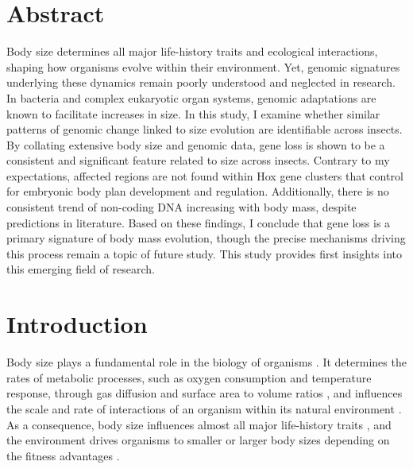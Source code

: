 \documentclass[11pt]{article}
\begin{document}
\section*{Abstract}
Body size determines all major life-history traits and ecological interactions, shaping how organisms evolve within their environment. Yet, genomic signatures underlying these dynamics remain poorly understood and neglected in research. In bacteria and complex eukaryotic organ systems, genomic adaptations are known to facilitate increases in size. In this study, I examine whether similar patterns of genomic change linked to size evolution are identifiable across insects. By collating extensive body size and genomic data, gene loss is shown to be a consistent and significant feature related to size across insects. Contrary to my expectations, affected regions are not found within Hox gene clusters that control for embryonic body plan development and regulation. Additionally, there is no consistent trend of non-coding DNA increasing with body mass, despite predictions in literature. Based on these findings, I conclude that gene loss is a primary signature of body mass evolution, though the precise mechanisms driving this process remain a topic of future study. This study provides first insights into this emerging field of research.
\pagebreak

\tableofcontents
\thispagestyle{empty}
\pagebreak
\setcounter{page}{1}


\linenumbers


\section{Introduction}
Body size plays a fundamental role in the biology of organisms \citep{roff1994evolution}. It determines the rates of metabolic processes, such as oxygen consumption and temperature response, through gas diffusion and surface area to volume ratios \citep{gasdiffusion}, and influences the scale and rate of interactions of an organism within its natural environment \citep{Peters_1983, mass-rate, interactions}. As a consequence, body size influences almost all major life-history traits \citep{mass-life-history}, and the environment drives organisms to smaller or larger body sizes depending on the fitness advantages \citep{smallervslarger}. 
\end{document}

